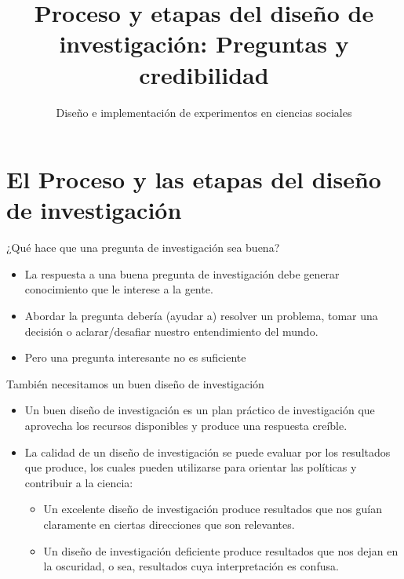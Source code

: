 \documentclass[
  ignorenonframetext,
]{beamer}
\title{Proceso y etapas del diseño de investigación: Preguntas y
credibilidad}
\author{Diseño e implementación de experimentos en ciencias sociales}
\date{}
\begin{document}
\frame{\titlepage}

\begin{frame}[allowframebreaks]
  \tableofcontents[hideallsubsections]
\end{frame}
\hypertarget{el-proceso-y-las-etapas-del-diseuxf1o-de-investigaciuxf3n}{%
\section{El Proceso y las etapas del diseño de
investigación}\label{el-proceso-y-las-etapas-del-diseuxf1o-de-investigaciuxf3n}}

\begin{frame}{¿Qué hace que una pregunta de investigación sea buena?}
\protect\hypertarget{quuxe9-hace-que-una-pregunta-de-investigaciuxf3n-sea-buena}{}
\begin{itemize}
\item
  La respuesta a una buena pregunta de investigación debe generar
  conocimiento que le interese a la gente.
\item
  Abordar la pregunta debería (ayudar a) resolver un problema, tomar una
  decisión o aclarar/desafiar nuestro entendimiento del mundo.
\item
  Pero una pregunta interesante no es suficiente
\end{itemize}
\end{frame}

\begin{frame}{También necesitamos un buen diseño de investigación}
\protect\hypertarget{tambiuxe9n-necesitamos-un-buen-diseuxf1o-de-investigaciuxf3n}{}
\begin{itemize}
\item
  Un buen diseño de investigación es un plan práctico de investigación
  que aprovecha los recursos disponibles y produce una respuesta
  creíble.
\item
  La calidad de un diseño de investigación se puede evaluar por los
  resultados que produce, los cuales pueden utilizarse para orientar las
  políticas y contribuir a la ciencia:

  \begin{itemize}
  \item
    Un excelente diseño de investigación produce resultados que nos
    guían claramente en ciertas direcciones que son relevantes.
  \item
    Un diseño de investigación deficiente produce resultados que nos
    dejan en la oscuridad, o sea, resultados cuya interpretación es
    confusa.
  \end{itemize}
\end{itemize}
\end{frame}
\end{document}
